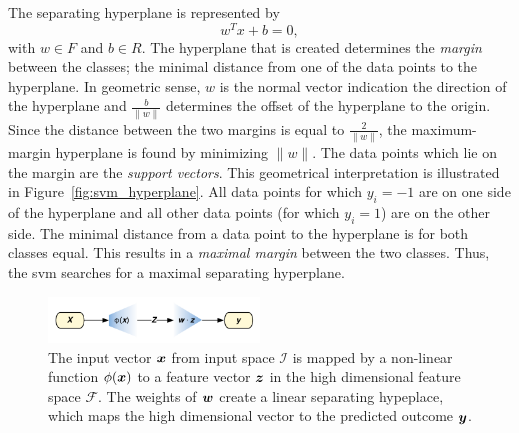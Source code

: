 The separating hyperplane is represented by
\begin{equation}
w^T x + b = 0,
\end{equation}
with $w \in F$ and $b \in R$.
The hyperplane that is created determines the \emph{margin} between the classes; the minimal distance from one of the data points to the hyperplane.
In geometric sense, $w$ is the normal vector indication the direction of the hyperplane and $\frac{b}{\lVert{w}\rVert}$ determines the offset of the hyperplane to the origin.
Since the distance between the two margins is equal to $\frac{2}{\lVert{w}\rVert}$, the maximum-margin hyperplane is found by minimizing $\lVert{w}\rVert$.
The data points which lie on the margin are the \emph{support vectors}.
This geometrical interpretation is illustrated in Figure~\ref{fig:svm_hyperplane}.
All data points for which $y_i = -1$ are on one side of the hyperplane and all other data points (for which $y_i = 1$) are on the other side.
The minimal distance from a data point to the hyperplane is for both classes equal.
This results in a \emph{maximal margin} between the two classes.
Thus, the \gls{svm} searches for a maximal separating hyperplane.

\begin{figure}
\centering
  \includegraphics[width=0.5\textwidth]{./Figures/chapter3/svm_mapping_spaces.pdf}
  \caption[Mapping spaces in \gls{svm}]{The input vector $\vectorsym{x}$ from input space $\mathcal{I}$ is mapped by a non-linear function $\phi(\vectorsym{x})$ to a feature vector $\vectorsym{z}$ in the high dimensional feature space $\mathcal{F}$. The weights of $\vectorsym{w}$ create a linear separating hypeplace, which maps the high dimensional vector to the predicted outcome $\vectorsym{y}$. }
  \label{fig:svm_mapping_spaces}
\end{figure}

